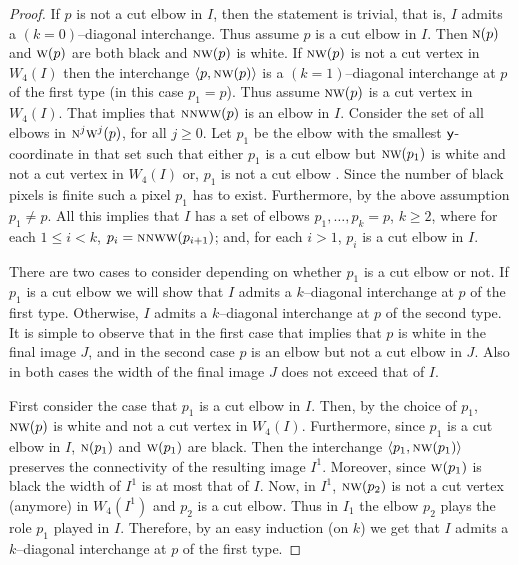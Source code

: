 \documentclass[lotsofwhite,charterfonts]{patmorin}
\newcommand{\N}{\textsc{n}}
\newcommand{\W}{\textsc{w}}
\newcommand{\NW}{\textsc{nw}}
\newcommand{\y}{\ensuremath{\protect\textup{\textsf{y}}}}
\newcommand{\ic}[2]{\langle #1,#2 \rangle}
\begin{document}
\begin{proof}
If $p$ is not a cut elbow in $I$, then the statement is trivial, that is, $I$ admits a $(k=0)$--diagonal interchange. Thus assume $p$ is a cut elbow in $I$. Then $\N(p)$ and $\W(p)$ are both black and $\NW(p)$ is white. If $\NW(p)$ is not a cut vertex in $W_4(I)$ then the interchange $\ic{p}{\NW(p)}$ is a $(k=1)$--diagonal interchange at $p$ of the first type (in this case $p_1=p$). Thus assume $\NW(p)$ is a cut vertex in $W_4(I)$. That implies that $\N\NW\W(p)$ is an elbow in $I$. Consider the set of all elbows in $\N^j\W^j(p)$, for all $j\geq 0$. Let $p_1$ be the elbow with the smallest \y-coordinate in that set such that either $p_1$ is a cut elbow but $\NW(p_1)$ is white and not a cut vertex in $W_4(I)$ or, $p_1$ is not a cut elbow . Since the number of black pixels is finite such a pixel $p_1$ has to exist. Furthermore, by the above assumption $p_1\not=p$. All this implies that $I$ has a set of elbows $p_1,\dots, p_k=p$, $k\geq 2$, where for each $1\leq i< k$, $p_i=\N\N\W\W(p_{i+1})$; and, for each $i>1$, $p_i$ is a cut elbow in $I$. 

There are two cases to consider depending on whether $p_1$ is a cut elbow or not. If $p_1$ is a cut elbow we will show that $I$ admits a $k$--diagonal interchange at $p$ of the first type. Otherwise, $I$ admits a $k$--diagonal interchange at $p$ of the second type. It is simple to observe that in the first case that implies that $p$ is white in the final image $J$, and in the second case $p$ is an elbow but not a cut elbow in $J$. Also in both cases the width of the final image $J$ does not exceed that of $I$.

First consider the case that $p_1$ is a cut elbow in $I$. Then, by the choice of $p_1$, $\NW(p)$ is white and not a cut vertex in $W_4(I)$. Furthermore, since $p_1$ is a cut elbow in $I$, $\N(p_1)$ and $\W(p_1)$ are black. Then the interchange $\ic{p_1}{\NW(p_1)}$ preserves the connectivity of the resulting image $I^1$. Moreover, since $\W(p_1)$ is black the width of $I^1$ is at most that of $I$. Now, in $I^1$, $\NW(p_2)$ is not a cut vertex (anymore) in $W_4(I^1)$ and $p_2$ is a cut elbow. Thus in $I_1$ the elbow $p_2$ plays the role $p_1$ played in $I$. Therefore, by an easy induction (on $k$) we get that $I$ admits a $k$--diagonal interchange at $p$ of the first type. 


\end{proof}
\end{document}
